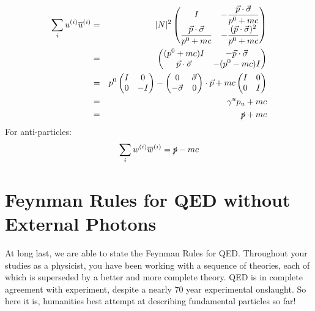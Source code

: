 \documentclass[12pt]{book}
\begin{document}
\begin{eqnarray*}
\sum_i u^{(i)} \overline{u}^{(i)}  &=& |N|^2 
\begin{pmatrix} 
\displaystyle I & -\displaystyle \frac{\vec{p}\cdot \vec{\sigma}}{p^0+mc} \\
\displaystyle \frac{\vec{p}\cdot\vec{\sigma}}{p^0+mc} &
-\displaystyle \frac{(\vec{p}\cdot\vec{\sigma})^2}{p^0+mc}\\ 
\end{pmatrix}\\
&=&
\begin{pmatrix} 
\displaystyle (p^0+mc) I & \displaystyle -\vec{p}\cdot \vec{\sigma} \\
\displaystyle \vec{p}\cdot\vec{\sigma} &
\displaystyle -(p^0-mc) I\\ 
\end{pmatrix}\\
&=& p^0 \begin{pmatrix} I & 0 \\ 0 & -I \end{pmatrix} 
- \begin{pmatrix} 0 & \vec{\sigma} \\ -\vec{\sigma} & 0 \end{pmatrix} \cdot \vec{p} 
+ mc \begin{pmatrix} I & 0 \\ 0 & I \end{pmatrix} \\
&=& \gamma^u p_u + mc \\
&=& \slashed{p} + mc \\
\end{eqnarray*}
For anti-particles:
$$\sum_i w^{(i)} \overline{w}^{(i)} = \slashed{p} - mc$$

\section{Feynman Rules for QED without External Photons}

At long last, we are able to state the Feynman Rules for QED.  Throughout your studies as a physicist, you have been working with a sequence of theories, each of which is superseded by a better and more complete theory.  QED is in complete agreement with experiment, despite a nearly 70 year experimental onslaught.  So here it is, humanities best attempt at describing fundamental particles so far!
\end{document}
